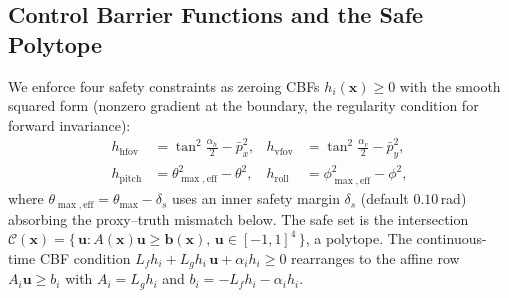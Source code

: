 \documentclass[11pt]{article}
\begin{document}
\subsection{Control Barrier Functions and the Safe Polytope}
\label{sec:cbf}
We enforce four safety constraints as zeroing CBFs $h_i(\mathbf x)\ge0$ with
the smooth squared form (nonzero gradient at the boundary, the regularity
condition for forward invariance):
\begin{align}
h_\text{hfov}&=\tan^2\!\tfrac{\alpha_h}{2}-\bar p_x^2, &
h_\text{vfov}&=\tan^2\!\tfrac{\alpha_v}{2}-\bar p_y^2,\\
h_\text{pitch}&=\theta_{\max,\text{eff}}^2-\theta^2, &
h_\text{roll}&=\phi_{\max,\text{eff}}^2-\phi^2,
\end{align}
where $\theta_{\max,\text{eff}}=\theta_{\max}-\delta_s$ uses an inner safety
margin $\delta_s$ (default $0.10\,$rad) absorbing the proxy--truth mismatch
below. The safe set is the intersection
$\mathcal C(\mathbf x)=\{\,\mathbf u: A(\mathbf x)\mathbf u\ge \mathbf b(\mathbf x),\,
\mathbf u\in[-1,1]^4\,\}$, a polytope. The continuous-time CBF condition
$L_f h_i+L_g h_i\,\mathbf u+\alpha_i h_i\ge0$ rearranges to the affine row
$A_i\mathbf u\ge b_i$ with $A_i=L_g h_i$ and $b_i=-L_f h_i-\alpha_i h_i$.
\end{document}
